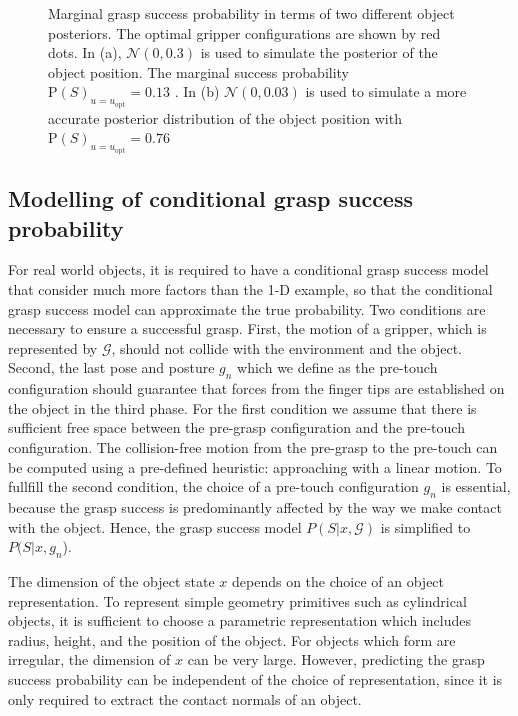 \begin{figure}[!htbp]
\centering
\def\svgwidth{1\linewidth}

\caption{ Marginal grasp success probability in terms of two different object posteriors. The optimal gripper configurations are shown by red dots. In (a), $\mathcal{N}(0, 0.3)$ is used to simulate the posterior of the object position. The marginal success probability ${\text{P}(S)}_{u = u_{\text{opt}}} = 0.13$  . In (b) $\mathcal{N}(0, 0.03)$ is used to simulate a more accurate posterior distribution of the object position with ${\text{P}(S)}_{u = u_{\text{opt}}} = 0.76$ }
\label{fig:1D_grasp}
\end{figure}	 


\subsection{Modelling of conditional grasp success probability }
For real world objects, it is required to have a conditional grasp success model that consider much more factors than the 1-D example, so that the conditional grasp success model can approximate the true probability. Two conditions are necessary to ensure a successful grasp. First, the motion of a gripper, which is represented by $\mathcal{G}$, should not collide with the environment and the object. Second, the last pose and posture $g_n$ which we define as the pre-touch configuration should guarantee that forces from the finger tips are established on the object in the third phase. For the first condition we assume that there is sufficient free space between the pre-grasp configuration and the pre-touch configuration. The collision-free motion from the pre-grasp to the pre-touch can be computed using a pre-defined heuristic: approaching with a linear motion. To fullfill the second condition, the choice of a pre-touch configuration $g_n$ is essential, because the grasp success is predominantly affected by the way we make contact with the object. Hence, the grasp success model $P(S | x,\mathcal{G})$ is simplified to $P(S | x, g_n$). 

The dimension of the object state $x$ depends on the choice of an object representation. To represent simple geometry primitives such as cylindrical objects, it is sufficient to choose a parametric representation which includes radius, height, and the position of the object. For objects which form are irregular, the dimension of $x$ can be very large. However, predicting the grasp success probability can be independent of the choice of representation, since it is only required to extract the contact normals of an object.  

